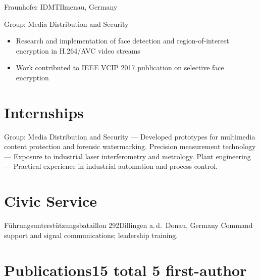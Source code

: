 \documentclass[11pt,a4paper,sans]{moderncv}
\begin{document}
%
  {Fraunhofer IDMT}{Ilmenau, Germany}{}%
  {Group: Media Distribution and Security%
   \begin{itemize}[nosep, leftmargin=1.2em, topsep=2pt]
     \item[\textendash] Research and implementation of face detection and region-of-interest encryption in H.264/AVC video streams
     \item[\textendash] Work contributed to IEEE VCIP 2017 publication on selective face encryption
   \end{itemize}}

\section{Internships}
%
  {Group: Media Distribution and Security --- Developed prototypes for multimedia content protection and forensic watermarking.}
%
  {Precision measurement technology --- Exposure to industrial laser interferometry and metrology.}
%
  {Plant engineering --- Practical experience in industrial automation and process control.}

\section{Civic Service}
%
  {F\"uhrungsunterst\"utzungsbataillon 292}{Dillingen a.\,d.\ Donau, Germany}{}%
  {Command support and signal communications; leadership training.}

\section{Publications\hfill{\normalfont\small 15 total \textbar{} 5 first-author}}
\end{document}
